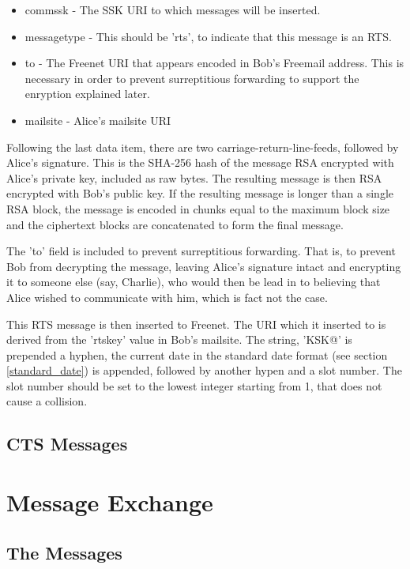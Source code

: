 \documentclass[12pt,a4paper]{article}
\begin{document}
\begin{itemize}
\item commssk - The SSK URI to which messages will be inserted.
\item messagetype - This should be 'rts', to indicate that this message is an RTS.
\item to - The Freenet URI that appears encoded in Bob's Freemail address. This is necessary in order to prevent surreptitious forwarding to support the enryption explained later.
\item mailsite - Alice's mailsite URI
\end{itemize}

Following the last data item, there are two carriage-return-line-feeds, followed by Alice's signature. This is the SHA-256 hash of the message RSA encrypted with Alice's private key, included as raw bytes. The resulting message is then RSA encrypted with Bob's public key. If the resulting message is longer than a single RSA block, the message is encoded in chunks equal to the maximum block size and the ciphertext blocks are concatenated to form the final message.

The 'to' field is included to prevent surreptitious forwarding. That is, to prevent Bob from decrypting the message, leaving Alice's signature intact and encrypting it to someone else (say, Charlie), who would then be lead in to believing that Alice wished to communicate with him, which is fact not the case.

This RTS message is then inserted to Freenet. The URI which it inserted to is derived from the 'rtskey' value in Bob's mailsite. The string, 'KSK@' is prepended a hyphen, the current date in the standard date format (see section \ref{standard_date}) is appended, followed by another hypen and a slot number. The slot number should be set to the lowest integer starting from 1, that does not cause a collision.

\subsection{CTS Messages}

\section{Message Exchange}
\subsection{The Messages}
\end{document}
